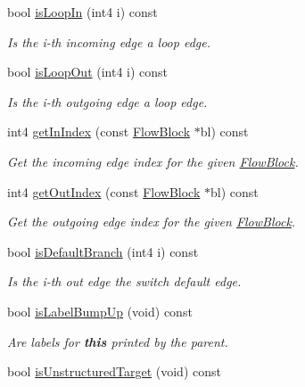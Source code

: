 \begin{DoxyCompactItemize}
bool \mbox{\hyperlink{class_flow_block_a1f96ae0843d407d233e21d071855e19b}{is\+Loop\+In}} (int4 i) const
\begin{DoxyCompactList}\small\item\em Is the i-\/th incoming edge a {\itshape loop} edge. \end{DoxyCompactList}\item 
bool \mbox{\hyperlink{class_flow_block_aec8b1d9c9c0fc5918dc1665a5161aea2}{is\+Loop\+Out}} (int4 i) const
\begin{DoxyCompactList}\small\item\em Is the i-\/th outgoing edge a {\itshape loop} edge. \end{DoxyCompactList}\item 
int4 \mbox{\hyperlink{class_flow_block_aa7e3329c296bc6ac805cc067aa4c301e}{get\+In\+Index}} (const \mbox{\hyperlink{class_flow_block}{Flow\+Block}} $\ast$bl) const
\begin{DoxyCompactList}\small\item\em Get the incoming edge index for the given \mbox{\hyperlink{class_flow_block}{Flow\+Block}}. \end{DoxyCompactList}\item 
int4 \mbox{\hyperlink{class_flow_block_a814ffded437db16866c5da50ba1990f8}{get\+Out\+Index}} (const \mbox{\hyperlink{class_flow_block}{Flow\+Block}} $\ast$bl) const
\begin{DoxyCompactList}\small\item\em Get the outgoing edge index for the given \mbox{\hyperlink{class_flow_block}{Flow\+Block}}. \end{DoxyCompactList}\item 
bool \mbox{\hyperlink{class_flow_block_a597d04517618311c838f3c25bdbb02a9}{is\+Default\+Branch}} (int4 i) const
\begin{DoxyCompactList}\small\item\em Is the i-\/th out edge the switch default edge. \end{DoxyCompactList}\item 
bool \mbox{\hyperlink{class_flow_block_afe445faa27ff80aab7f9830068da9d39}{is\+Label\+Bump\+Up}} (void) const
\begin{DoxyCompactList}\small\item\em Are labels for {\bfseries{this}} printed by the parent. \end{DoxyCompactList}\item 
bool \mbox{\hyperlink{class_flow_block_aa6033732e50b3e5476a86b8883a5483a}{is\+Unstructured\+Target}} (void) const

\end{DoxyCompactItemize}
